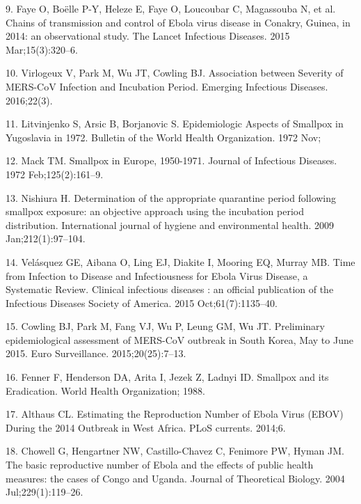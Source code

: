\documentclass[]{article}
\begin{document}
\hypertarget{ref-Faye:2015jc}{}
9. Faye O, Boëlle P-Y, Heleze E, Faye O, Loucoubar C, Magassouba N, et
al. Chains of transmission and control of Ebola virus disease in
Conakry, Guinea, in 2014: an observational study. The Lancet Infectious
Diseases. 2015 Mar;15(3):320--6.

\hypertarget{ref-Virlogeux:2016ty}{}
10. Virlogeux V, Park M, Wu JT, Cowling BJ. Association between Severity
of MERS-CoV Infection and Incubation Period. Emerging Infectious
Diseases. 2016;22(3).

\hypertarget{ref-Litvinjenko:1972vp}{}
11. Litvinjenko S, Arsic B, Borjanovic S. Epidemiologic Aspects of
Smallpox in Yugoslavia in 1972. Bulletin of the World Health
Organization. 1972 Nov;

\hypertarget{ref-Mack:1972jc}{}
12. Mack TM. Smallpox in Europe, 1950-1971. Journal of Infectious
Diseases. 1972 Feb;125(2):161--9.

\hypertarget{ref-Nishiura:2009dh}{}
13. Nishiura H. Determination of the appropriate quarantine period
following smallpox exposure: an objective approach using the incubation
period distribution. International journal of hygiene and environmental
health. 2009 Jan;212(1):97--104.

\hypertarget{ref-Velasquez:2015gv}{}
14. Velásquez GE, Aibana O, Ling EJ, Diakite I, Mooring EQ, Murray MB.
Time from Infection to Disease and Infectiousness for Ebola Virus
Disease, a Systematic Review. Clinical infectious diseases : an official
publication of the Infectious Diseases Society of America. 2015
Oct;61(7):1135--40.

\hypertarget{ref-Cowling:2015vb}{}
15. Cowling BJ, Park M, Fang VJ, Wu P, Leung GM, Wu JT. Preliminary
epidemiological assessment of MERS-CoV outbreak in South Korea, May to
June 2015. Euro Surveillance. 2015;20(25):7--13.

\hypertarget{ref-Fenner:1988ux}{}
16. Fenner F, Henderson DA, Arita I, Jezek Z, Ladnyi ID. Smallpox and
its Eradication. World Health Organization; 1988.

\hypertarget{ref-Althaus:2014cw}{}
17. Althaus CL. Estimating the Reproduction Number of Ebola Virus (EBOV)
During the 2014 Outbreak in West Africa. PLoS currents. 2014;6.

\hypertarget{ref-Chowell:2004gh}{}
18. Chowell G, Hengartner NW, Castillo-Chavez C, Fenimore PW, Hyman JM.
The basic reproductive number of Ebola and the effects of public health
measures: the cases of Congo and Uganda. Journal of Theoretical Biology.
2004 Jul;229(1):119--26.
\end{document}
